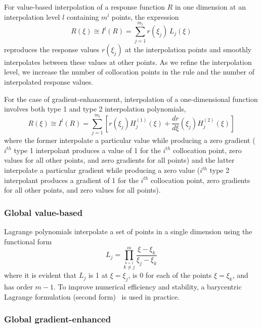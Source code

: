 For value-based interpolation of a response function $R$ in one
dimension at an interpolation level $l$ containing $m^l$ points, the
expression
\begin{equation}
R(\xi) \cong I^l(R) = \sum_{j=1}^{m_l} r(\xi_j)\,L_j(\xi) \label{eq:lagrange_interp_1d}
\end{equation}
reproduces the response values $r(\xi_j)$ at the interpolation points
and smoothly interpolates between these values at other points.  As we
refine the interpolation level, we increase the number of collocation 
points in the rule and the number of interpolated response values.

For the case of gradient-enhancement, interpolation of a 
one-dimensional function
involves both type 1 and type 2 interpolation polynomials,
\begin{equation}
R(\xi) \cong I^l(R) = \sum_{j=1}^{m_l} \left[ r(\xi_j) H_j^{(1)}(\xi) + 
  \frac{dr}{d\xi}(\xi_j) H_j^{(2)}(\xi) \right] \label{eq:hermite_interp_1d}
\end{equation}
where the former interpolate a particular value while producing a zero
gradient ($i^{th}$ type 1 interpolant produces a value of 1 for the
$i^{th}$ collocation point, zero values for all other points, and zero
gradients for all points) and the latter interpolate a particular
gradient while producing a zero value ($i^{th}$ type 2 interpolant
produces a gradient of 1 for the $i^{th}$ collocation point, zero
gradients for all other points, and zero values for all points).


\subsubsection{Global value-based} \label{uq:expansion:interp:Lagrange}

Lagrange polynomials interpolate a set of points in a single dimension
using the functional form
\begin{equation}
L_j = \prod_{\stackrel{\scriptstyle k=1}{k \ne j}}^m 
\frac{\xi - \xi_k}{\xi_j - \xi_k} \label{eq:lagrange_poly_1d}
\end{equation}
where it is evident that $L_j$ is 1 at $\xi = \xi_j$, is 0 for each of
the points $\xi = \xi_k$, and has order $m - 1$.  To improve numerical
efficiency and stability, a barycentric Lagrange formulation (second
form)~\cite{BerTref04,Higham04} is used in practice.

\subsubsection{Global gradient-enhanced} \label{uq:expansion:interp:Hermite}

